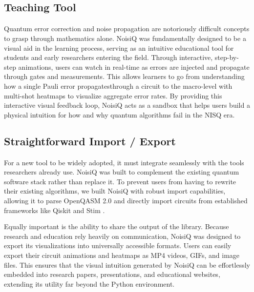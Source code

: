 \documentclass[10pt,twocolumn]{article}
\begin{document}
\subsection{Teaching Tool}
\label{subsec:teaching}
\paragraph{}
    Quantum error correction and noise propagation are notoriously difficult concepts to grasp through mathematics alone. 
NoisiQ was fundamentally designed to be a visual aid in the learning process, serving as an intuitive educational tool for students and early researchers entering the field. 
Through interactive, step-by-step animations, users can watch in real-time as errors are injected and propagate through gates and measurements. 
This allows learners to go from understanding how a single Pauli error propagatesthrough a circuit to the macro-level with multi-shot heatmaps to visualize aggregate error rates. 
By providing this interactive visual feedback loop, NoisiQ acts as a sandbox that helps users build a physical intuition for how and why quantum algorithms fail in the NISQ era.

\subsection{Straightforward Import / Export}
\label{subsec:importexport}
\paragraph{}
    For a new tool to be widely adopted, it must integrate seamlessly with the tools researchers already use. 
NoisiQ was built to complement the existing quantum software stack rather than replace it. 
To prevent users from having to rewrite their existing algorithms, we built NoisiQ with robust import capabilities, allowing it to parse OpenQASM 2.0 \cite{openqasm2017} and directly import circuits from established frameworks like Qiskit \cite{qiskit2024} and Stim \cite{stim2021}. 

    Equally important is the ability to share the output of the library. 
Because research and education rely heavily on communication, NoisiQ was designed to export its visualizations into universally accessible formats. 
Users can easily export their circuit animations and heatmaps as MP4 videos, GIFs, and image files. 
This ensures that the visual intuition generated by NoisiQ can be effortlessly embedded into research papers, presentations, and educational websites, extending its utility far beyond the Python environment.
\end{document}
